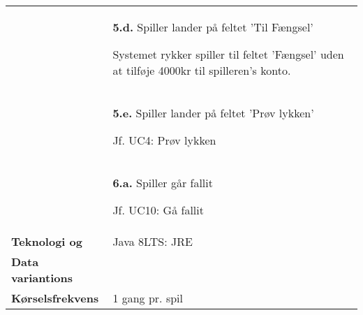 \documentclass[class=article, crop=false]{standalone}
\begin{document}
\begin{table}[H]
\begin{tabularx}{\textwidth}{|l|X|}
                            & \textbf{5.d.} Spiller lander på feltet 'Til Fængsel'
                            \begin{enumerate} \begin{tabenum}
                                                  \item Systemet rykker spiller til feltet 'Fængsel' uden at tilføje 4000kr til spilleren's konto.
                            \end{tabenum} \end{enumerate}
                            \\


                            & \textbf{5.e.} Spiller lander på feltet 'Prøv lykken'
                            \begin{enumerate} \begin{tabenum}
                                                  \item Jf. UC4: Prøv lykken
                            \end{tabenum} \end{enumerate}
                            \\

                            & \textbf{6.a.} Spiller går fallit
                            \begin{enumerate} \begin{tabenum}
                                                  \item Jf. UC10: Gå fallit
                            \end{tabenum} \end{enumerate}
                            \\


            \hline








            \textbf{Teknologi og}     & Java 8LTS: JRE \\
            \textbf{Data variantions} &  \\ \hline
            \textbf{Kørselsfrekvens} & 1 gang pr. spil\\ \hline
        \end{tabularx}


    \end{table}
\end{document}
